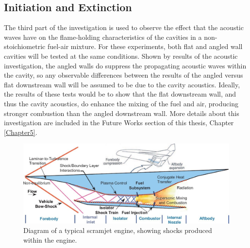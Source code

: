 
\subsection{Initiation and Extinction}

The third part of the investigation is used to observe the effect that the acoustic waves have on the flame-holding characteristics of the cavities in a non-stoichiometric fuel-air mixture. For these experiments, both flat and angled wall cavities will be tested at the same conditions. Shown by results of the acoustic investigation, the angled walls do suppress the propagating acoustic waves within the cavity, so any observable differences between the results of the angled versus flat downstream wall will be assumed to be due to the cavity acoustics. Ideally, the results of these tests would be to show that the flat downstream wall, and thus the cavity acoustics, do enhance the mixing of the fuel and air, producing stronger combustion than the angled downstream wall. More details about this investigation are included in the Future Works section of this thesis, Chapter \ref{Chapter5}.


\newpage

\begin{figure}
\centering
\includegraphics[width=\textwidth]{Figures/scramjet.jpg}
\caption[Scramjet Diagram]{Diagram of a typical scramjet engine, showing shocks produced within the engine. \cite{scramjetFig}}
\label{fig:scramjet}
\end{figure}


